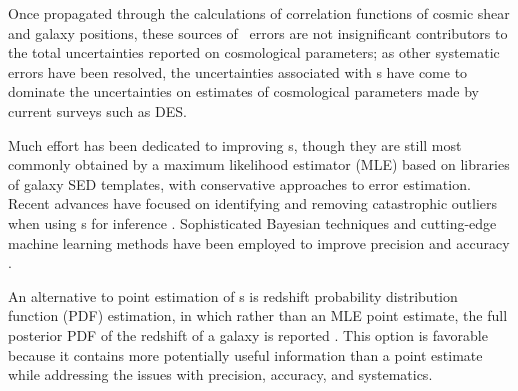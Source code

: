 

Once propagated through the calculations of correlation functions of cosmic shear and galaxy positions, these sources of \pz\ errors are not insignificant contributors to the total uncertainties reported on cosmological parameters; as other systematic errors have been resolved, the uncertainties associated with \pz s have come to dominate the uncertainties on estimates of cosmological parameters made by current surveys such as DES.

Much effort has been dedicated to improving \pz s, though they are still most commonly obtained by a maximum likelihood estimator (MLE) based on libraries of galaxy SED templates, with conservative approaches to error estimation.  
Recent advances have focused on identifying and removing catastrophic outliers when using \pz s for 
inference \citep{Gorecki2014}.  
Sophisticated Bayesian techniques and cutting-edge machine learning methods have been employed to improve precision \citep{Carliles2010} and accuracy \citep{Sadeh2015}. 

An alternative to point estimation of \pz s is redshift probability distribution function (PDF) estimation, in which rather than an MLE point estimate, the full posterior PDF of the redshift of a galaxy is reported \citep{Koo1999}.  
This option is favorable because it contains more potentially useful information than a point estimate while addressing the issues with precision, accuracy, and systematics.  

